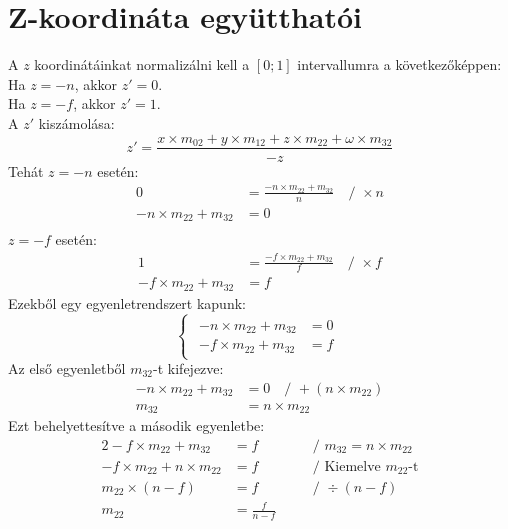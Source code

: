 \documentclass[12pt]{report}
\begin{document}
\section{Z-koordináta együtthatói}
A $z$ koordinátáinkat normalizálni kell a $[0;1]$ intervallumra a
következőképpen: \\ Ha $z=-n$, akkor $z'=0$. \\ Ha $z=-f$, akkor $z'=1$.\\ A
$z'$ kiszámolása:
\[z'= \frac{x\times m_{02} + y\times m_{12} + z\times m_{22} + \omega\times m_{32}}{-z}\]
Tehát $z=-n$ esetén:
\begin{align*}
    0                         & = \frac{-n \times m_{22} + m_{32}}{n} \quad\text{/ }\times n \\
    -n \times m_{22} + m_{32} & = 0                                                          \\
\end{align*}
$z=-f$ esetén:
\begin{align*}
    1                         & = \frac{-f \times m_{22} + m_{32}}{f} \quad\text{/ }\times f \\
    -f \times m_{22} + m_{32} & = f
\end{align*}
Ezekből egy egyenletrendszert kapunk:
\[
    \begin{cases}
        \begin{aligned}
            -n \times m_{22} + m_{32} & = 0 \\
            -f \times m_{22} + m_{32} & = f
        \end{aligned}
    \end{cases}
\]
Az első egyenletből $m_{32}$-t kifejezve:
\begin{align*}
    -n \times m_{22} + m_{32} & = 0 \quad\text{/ }+(n \times m_{22}) \\
    m_{32}                    & = n \times m_{22}
\end{align*}
\[
\]
Ezt behelyettesítve a második egyenletbe:
\begin{alignat*}{2}
    -f \times m_{22} + m_{32}          & = f             & \quad & \text{/ } m_{32}                     = n \times m_{22} \\
    -f \times m_{22} + n \times m_{22} & = f             & \quad & \text{/ Kiemelve } m_{22}\text{-t}                     \\
    m_{22}\times (n-f)                 & = f             & \quad & \text{/ }\div(n-f)                                     \\
    m_{22}                             & = \frac{f}{n-f} &       &
\end{alignat*}
\end{document}
